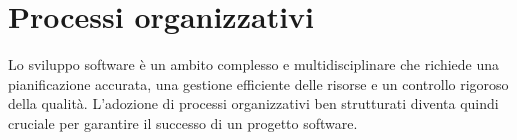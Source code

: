 \section{Processi organizzativi}
Lo sviluppo software è un ambito complesso e multidisciplinare che richiede una pianificazione accurata, una gestione efficiente delle risorse e un controllo rigoroso della qualità. L'adozione di processi organizzativi ben strutturati diventa quindi cruciale per garantire il successo di un progetto software.






